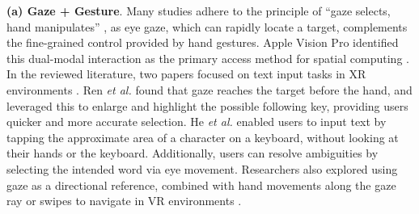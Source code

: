 \documentclass[review]{fcs}
\newcommand{\revise}[2]{\textcolor[rgb]{0,0,0}{#2}}
\begin{document}
\textbf{(a) Gaze + Gesture}. Many studies adhere to the principle of “gaze selects, hand manipulates” \cite{10108465}, as eye gaze, which can rapidly locate a target, complements the fine-grained control provided by hand gestures. Apple Vision Pro identified this dual-modal interaction as the primary access method for spatial computing \cite{Apple}. In the reviewed literature, two papers focused on text input tasks in XR environments \cite{10474330, DBLP:conf/chi/HeLP22}.
\revise{Ren \textit{et al.} utilized the fact that gaze reaches the target before the hand, predicting the next likely key and enlarging and highlighting it, allowing users to press it more quickly and accurately \cite{10474330}. He \textit{et al.} enabled users to input text by tapping the approximate area of a character on a keyboard, without needing to see their hands or the keyboard. Additionally, users can resolve ambiguities by selecting the intended word via eye movement \cite{DBLP:conf/chi/HeLP22}.}{Ren \textit{et al.} \cite{10474330} found that gaze reaches the target before the hand, and leveraged this to enlarge and highlight the possible following key, providing users quicker and more accurate selection. He \textit{et al.} \cite{DBLP:conf/chi/HeLP22} enabled users to input text by tapping the approximate area of a character on a keyboard, without looking at their hands or the keyboard. Additionally, users can resolve ambiguities by selecting the intended word via eye movement.}
Researchers also explored using gaze as a directional reference, combined with hand movements along the gaze ray or swipes to navigate in VR environments \cite{10.1145/3613904.3642147}.
\end{document}
